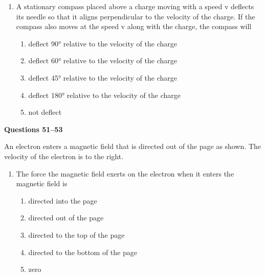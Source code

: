 \documentclass{../../oss-apphys}
\begin{document}
\begin{multicols}{2}
\begin{enumerate}[leftmargin=18pt,resume]
  \item A stationary compass placed above a charge moving with a speed v
    deflects its needle so that it aligns perpendicular to the velocity of the
    charge. If the compass also moves at the speed v along with the charge,
    the compass will
    \begin{enumerate}[noitemsep,topsep=0pt,leftmargin=18pt,label=(\Alph*)]
    \item deflect \ang{90} relative to the velocity of the charge
    \item deflect \ang{60} relative to the velocity of the charge
    \item deflect \ang{45} relative to the velocity of the charge
    \item deflect \ang{180} relative to the velocity of the charge
    \item not deflect
    \end{enumerate}    
  \end{enumerate}

  \columnbreak
  
  \textbf{Questions 51--53}
  
  An electron enters a magnetic field that is directed out of the page as shown.
  The velocity of the electron is to the right.
  \begin{center}
  \end{center}

  \begin{enumerate}[leftmargin=18pt,resume]
  \item The force the magnetic field exerts on the electron when it enters the
    magnetic field is
    \begin{enumerate}[noitemsep,topsep=0pt,leftmargin=18pt,label=(\Alph*)]
    \item directed into the page
    \item directed out of the page
    \item directed to the top of the page
    \item directed to the bottom of the page
    \item zero
    \end{enumerate}


\end{enumerate}
\end{multicols}
\end{document}
